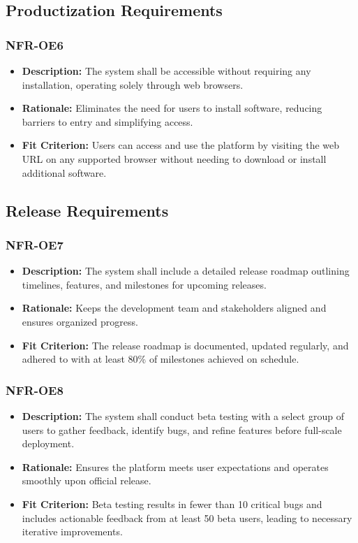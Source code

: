 \documentclass[12pt]{article}
\begin{document}
\subsection{Productization Requirements}
\subsubsection*{NFR-OE6}
\begin{itemize}
  \item \textbf{Description:} The system shall be accessible without requiring any installation, operating solely through web browsers.
  \item \textbf{Rationale:} Eliminates the need for users to install software, reducing barriers to entry and simplifying access.
  \item \textbf{Fit Criterion:} Users can access and use the platform by visiting the web URL on any supported browser without needing to download or install additional software.
\end{itemize}
\subsection{Release Requirements}
\subsubsection*{NFR-OE7}
\begin{itemize}
  \item \textbf{Description:} The system shall include a detailed release roadmap outlining timelines, features, and milestones for upcoming releases.
  \item \textbf{Rationale:} Keeps the development team and stakeholders aligned and ensures organized progress.
  \item \textbf{Fit Criterion:} The release roadmap is documented, updated regularly, and adhered to with at least 80\% of milestones achieved on schedule.
\end{itemize}
\subsubsection*{NFR-OE8}
\begin{itemize}
  \item \textbf{Description:} The system shall conduct beta testing with a select group of users to gather feedback, identify bugs, and refine features before full-scale deployment.
  \item \textbf{Rationale:} Ensures the platform meets user expectations and operates smoothly upon official release.
  \item \textbf{Fit Criterion:} Beta testing results in fewer than 10 critical bugs and includes actionable feedback from at least 50 beta users, leading to necessary iterative improvements.
\end{itemize}
\end{document}
